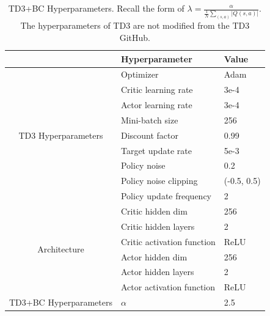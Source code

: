 \documentclass{article}
\newcommand{\al}{\alpha}
\begin{document}
\begin{table}[ht]
\centering
\begin{tabular}{cll}
\toprule
& Hyperparameter & Value \\
\midrule
\multirow{9}{*}{TD3 Hyperparameters} & Optimizer & Adam~\citep{adam} \\
                                      & Critic learning rate & 3e-4 \\
                                      & Actor learning rate  & 3e-4 \\
                                      & Mini-batch size      & 256 \\
                                      & Discount factor      & 0.99 \\
                                      & Target update rate   & 5e-3 \\
                                      & Policy noise         & 0.2 \\
                                      & Policy noise clipping & (-0.5, 0.5) \\
                                      & Policy update frequency & 2 \\
\midrule
\multirow{6}{*}{Architecture}         & Critic hidden dim    & 256        \\
                                      & Critic hidden layers & 2          \\
                                      & Critic activation function & ReLU \\
                                      & Actor hidden dim     & 256        \\
                                      & Actor hidden layers  & 2          \\
                                      & Actor activation function & ReLU \\
\midrule
\multirow{1}{*}{TD3+BC Hyperparameters}  & $\alpha$             & 2.5 \\
\bottomrule
\end{tabular}
\vspace{6pt}
\caption{TD3+BC Hyperparameters. Recall the form of $\lambda = \frac{\al}{\frac{1}{N} \sum_{(s,a)} |Q(s,a)|}$. The hyperparameters of TD3 are not modified from the TD3 GitHub.}\label{table:td3_hyp}
\end{table} %
\end{document}
